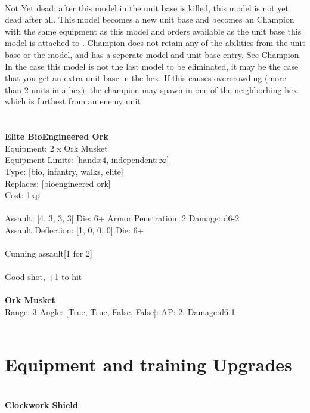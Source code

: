 \ \\
Not Yet dead: after this model in the unit base is killed, this model is not yet dead after all. This model becomes a new unit base and becomes an Champion with the same equipment as this model and orders available as the unit base this model is attached to . Champion does not retain any of the abilities from the unit base or the model, and has a seperate model and unit base entry. See Champion. In the case this model is not the last model to be eliminated, it may be the case that you get an extra unit base in the hex. If this causes overcrowding (more than 2 units in a hex), the champion may spawn in one of the neighborhing hex which is furthest from an enemy unit\\ 

\ \\
 
\ \\

{\bf Elite BioEngineered Ork } \\
Equipment: 2 x Ork Musket \\
Equipment Limits: [hands:4, independent:∞] \\
Type: [bio, infantry, walks, elite] \\
Replaces: [bioengineered ork] \\
Cost: 1xp\\
\ \\
Assault: [4, 3, 3, 3] Die: 6+ Armor Penetration: 2 Damage: d6-2 \\
Assault Deflection: [1, 0, 0, 0] Die: 6+\\
\\ 
Cunning assault[1 for 2]\\ 
 
\ \\
Good shot, +1 to hit\\ 

\ \\
{\bf Ork Musket } \\



Range: 3  Angle: [True, True, False, False]: AP: 2: Damage:d6-1 \\




 
\ \\

\section{Equipment and training Upgrades}\ \\
{\bf Clockwork Shield } \\

